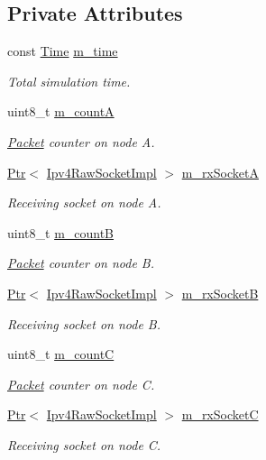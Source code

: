 \subsection*{Private Attributes}
\begin{DoxyCompactItemize}
\item 
const \hyperlink{classns3_1_1Time}{Time} \hyperlink{classns3_1_1olsr_1_1TcRegressionTest_abe52319ff844af6f88afe7630ffa89fd}{m\+\_\+time}
\begin{DoxyCompactList}\small\item\em Total simulation time. \end{DoxyCompactList}\item 
uint8\+\_\+t \hyperlink{classns3_1_1olsr_1_1TcRegressionTest_ad4df9f9a1950da47355d1623fb2a57ed}{m\+\_\+countA}
\begin{DoxyCompactList}\small\item\em \hyperlink{classns3_1_1Packet}{Packet} counter on node A. \end{DoxyCompactList}\item 
\hyperlink{classns3_1_1Ptr}{Ptr}$<$ \hyperlink{classns3_1_1Ipv4RawSocketImpl}{Ipv4\+Raw\+Socket\+Impl} $>$ \hyperlink{classns3_1_1olsr_1_1TcRegressionTest_accd5e6cfdc334e18e2aa762c34933d65}{m\+\_\+rx\+SocketA}
\begin{DoxyCompactList}\small\item\em Receiving socket on node A. \end{DoxyCompactList}\item 
uint8\+\_\+t \hyperlink{classns3_1_1olsr_1_1TcRegressionTest_a600c2880459f6b10640afc51fa268c91}{m\+\_\+countB}
\begin{DoxyCompactList}\small\item\em \hyperlink{classns3_1_1Packet}{Packet} counter on node B. \end{DoxyCompactList}\item 
\hyperlink{classns3_1_1Ptr}{Ptr}$<$ \hyperlink{classns3_1_1Ipv4RawSocketImpl}{Ipv4\+Raw\+Socket\+Impl} $>$ \hyperlink{classns3_1_1olsr_1_1TcRegressionTest_a613e960a6c03b010469285bed546926a}{m\+\_\+rx\+SocketB}
\begin{DoxyCompactList}\small\item\em Receiving socket on node B. \end{DoxyCompactList}\item 
uint8\+\_\+t \hyperlink{classns3_1_1olsr_1_1TcRegressionTest_a7ff866c3417a672eb3bb43f08a399eaa}{m\+\_\+countC}
\begin{DoxyCompactList}\small\item\em \hyperlink{classns3_1_1Packet}{Packet} counter on node C. \end{DoxyCompactList}\item 
\hyperlink{classns3_1_1Ptr}{Ptr}$<$ \hyperlink{classns3_1_1Ipv4RawSocketImpl}{Ipv4\+Raw\+Socket\+Impl} $>$ \hyperlink{classns3_1_1olsr_1_1TcRegressionTest_a975ca6a79376d46d9bd30990e54dd79c}{m\+\_\+rx\+SocketC}
\begin{DoxyCompactList}\small\item\em Receiving socket on node C. \end{DoxyCompactList}\end{DoxyCompactItemize}
